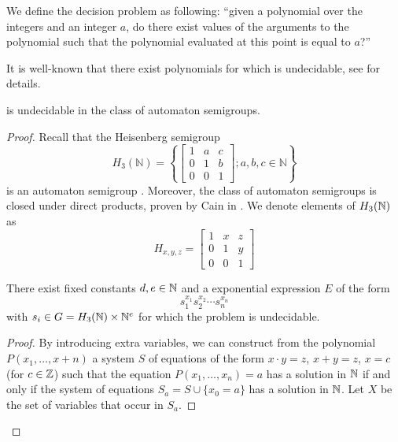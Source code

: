 \documentclass[11pt, titlepage]{article}
\begin{document}
\begin{definition}
  We define the decision problem  as following:
  ``given a polynomial over the integers and an integer $a$, do there
  exist values of the arguments to the polynomial such that the
  polynomial evaluated at this point is equal to $a$?''
\end{definition}

It is well-known that there exist polynomials for which
 is undecidable, see \cite{Matiyasevich:hilbert} for
details.

\begin{theorem}
   is undecidable in the class of automaton semigroups.
\end{theorem}
\begin{proof}

Recall that the Heisenberg semigroup
\[
  H_3(\mathbb{N}) = \left\{
      \begin{bmatrix}
        1 & a & c \\
        0 & 1 & b \\
        0 & 0 & 1
      \end{bmatrix}; a, b, c \in \mathbb{N}
    \right\}
\]
is an automaton semigroup \cite{Bondarenko:heisenberg}. Moreover, the
class of automaton semigroups is closed under direct products, proven
by Cain in \cite{Cain09:auto_sg}. We denote elements of $H_3(\mathbb{N})$ as
\[
  H_{x,y,z} = 
      \begin{bmatrix}
        1 & x & z \\
        0 & 1 & y \\
        0 & 0 & 1
      \end{bmatrix}
\]

\begin{proposition}
  There exist fixed constants $d,e \in \mathbb{N}$ and a exponential
  expression $E$ of the form
  \[s_1^{x_1} s_2^{x_2}\cdots s_n^{x_n} \] with
  $s_i \in G = H_3(\mathbb{N}) \times \mathbb{N}^e$ for which the 
  problem is undecidable.
\end{proposition}

\begin{proof}
  By introducing extra variables, we can construct from the polynomial
  $P(x_1, \ldots, x+n)$ a system $S$ of equations of the form
  $x\cdot y = z$, $x+y = z$, $x = c$ (for $c \in \mathbb{Z}$) such that the
  equation $P(x_1,\ldots, x_n) = a$ has a solution in $\mathbb{N}$ if and only
  if the system of equations $S_a = S \cup \{x_0 = a\}$ has a solution
  in $\mathbb{N}$. Let $X$ be the set of variables that occur in $S_a$.


\end{proof}
\end{proof}
\end{document}
